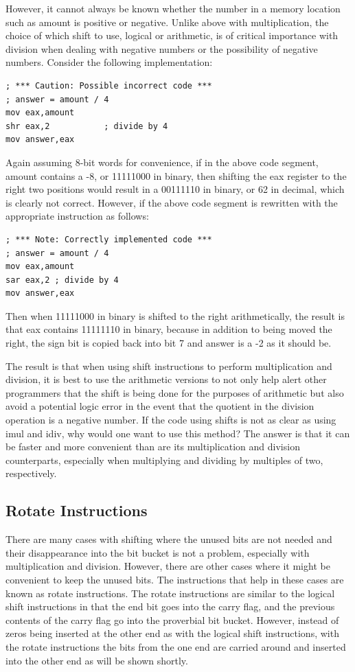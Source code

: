 \documentclass[10pt]{book}
\begin{document}
However, it cannot always be known whether the number in a memory location such as amount is positive or negative. Unlike above with multiplication, the choice of which shift to use, logical or arithmetic, is of critical importance with division when dealing with negative numbers or the possibility of negative numbers. Consider the following implementation:

\begin{verbatim}
; *** Caution: Possible incorrect code ***
; answer = amount / 4
mov eax,amount
shr eax,2           ; divide by 4
mov answer,eax
\end{verbatim}

Again assuming 8-bit words for convenience, if in the above code segment, amount contains a -8, or 11111000 in binary, then shifting the eax register to the right two positions would result in a 00111110 in binary, or 62 in decimal, which is clearly not correct. However, if the above code segment is rewritten with the appropriate instruction as follows:
\begin{verbatim}
; *** Note: Correctly implemented code ***
; answer = amount / 4
mov eax,amount
sar eax,2 ; divide by 4
mov answer,eax
\end{verbatim}

Then when 11111000 in binary is shifted to the right arithmetically, the result is that eax contains 11111110 in binary, because in addition to being moved the right, the sign bit is copied back into bit 7 and answer is a -2 as it should be.

The result is that when using shift instructions to perform multiplication and division, it is best to use the arithmetic versions to not only help alert other programmers that the shift is being done for the purposes of arithmetic but also avoid a potential logic error in the event that the quotient in the division operation is a negative number. If the code using shifts is not as clear as using imul and idiv, why would one want to use this method? The answer is that it can be faster and more convenient than are its multiplication and division counterparts, especially when multiplying and dividing by multiples of two, respectively.

\subsection{Rotate Instructions}
There are many cases with shifting where the unused bits are not needed and their disappearance into the bit bucket is not a problem, especially with multiplication and division. However, there are other cases where it might be convenient to keep the unused bits. The instructions that help in these cases are known as rotate instructions. The rotate instructions are similar to the logical shift instructions in that the end bit goes into the carry flag, and the previous contents of the carry flag go into the proverbial bit bucket. However, instead of zeros being inserted at the other end as with the logical shift instructions, with the rotate instructions the bits from the one end are carried around and inserted into the other end as will be shown shortly.
\end{document}
